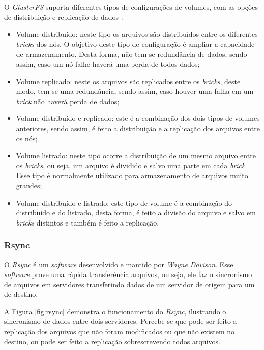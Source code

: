 O \textit{GlusterFS} suporta diferentes tipos de configurações de volumes, com as opções de distribuição e replicação de dados \cite{glusterfs}:
\begin{itemize}
 \item Volume distribuído: neste tipo os arquivos são distribuídos entre os diferentes \textit{bricks} dos nós. O objetivo deste tipo de 
 configuração é ampliar a capacidade de armazenamento. Desta forma, não tem-se redundância de dados, sendo assim, caso um nó falhe haverá uma 
 perda de todos dados;
 \item Volume replicado: neste os arquivos são replicados entre os \textit{bricks}, deste modo, tem-se uma redundância, sendo assim, caso houver 
 uma falha em um \textit{brick} não haverá perda de dados;
 \item Volume distribuído e replicado: este é a combinação dos dois tipos de volumes anteriores, sendo assim, é feito a distribuição 
 e a replicação dos arquivos entre os nós;
 \item Volume listrado: neste tipo ocorre a distribuição de um mesmo arquivo entre os \textit{bricks}, ou seja, um arquivo é dividido e salvo uma
 parte em cada \textit{brick}. Esse tipo é normalmente utilizado para armazenamento de arquivos muito grandes;
 \item Volume distribuído e listrado: este tipo de volume é a combinação do distribuído e do listrado, desta forma, é feito a divisão do arquivo 
 e salvo em \textit{bricks} distintos e também é feito a replicação.
\end{itemize}

\subsubsection{Rsync}
\label{section:rsync}
O \textit{Rsync} \cite{rsync} é um \textit{software} desenvolvido e mantido por \textit{Wayne Davison}. Esse \textit{software} prove uma rápida
transferência arquivos, ou seja, ele faz o sincronismo de arquivos em servidores transferindo dados de um servidor de origem para um de destino.

A Figura \ref{fig:rsync} demonstra o funcionamento do \textit{Rsync}, ilustrando o sincronismo de dados entre dois servidores. Percebe-se
que pode ser feito a replicação dos arquivos que não foram modificados ou que não existem no destino, ou pode ser feito a replicação 
sobrescrevendo todos arquivos.

